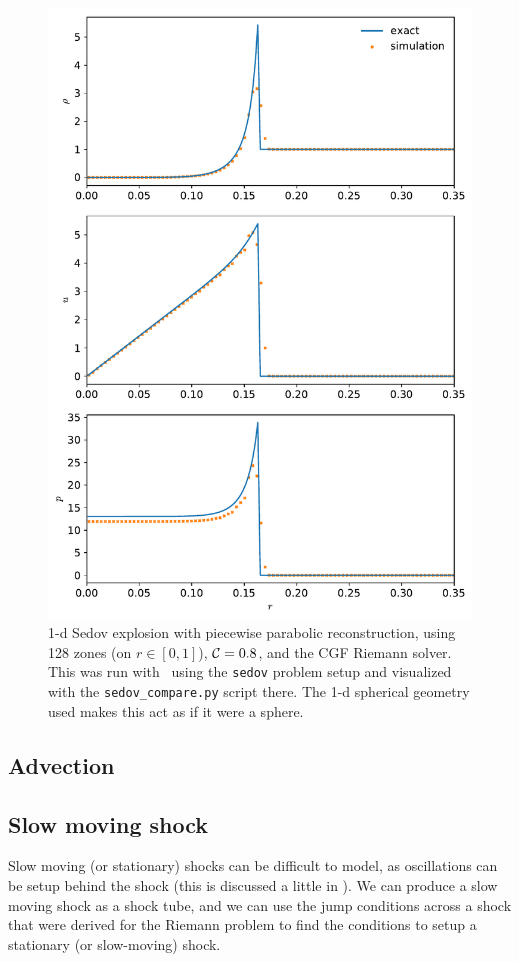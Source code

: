 \begin{figure}[t]
\centering
\includegraphics[width=0.7\linewidth]{hydro1d_sedov_1dsph}
\caption[1-d spherical Sedov problem]{\label{fig:Euler:doublerare:ppm} 1-d Sedov explosion with
  piecewise parabolic reconstruction, using 128 zones (on $r \in
  [0,1]$), ${\mathcal{C}} = 0.8$, and the CGF Riemann solver.  This was run
  with \hydrooned\ using the {\tt sedov} problem setup and visualized
  with the {\tt sedov\_compare.py} script there.  The 1-d spherical
  geometry used makes this act as if it were a sphere.}
\end{figure}


\subsection{Advection}

\subsection{Slow moving shock}

Slow moving (or stationary) shocks can be difficult to model, as
oscillations can be setup behind the shock (this is discussed a little
in \cite{colellawoodward:1984,leveque:2002}).  We can produce a slow
moving shock as a shock tube, and we can use the jump conditions 
across a shock that were derived for the Riemann problem to find the
conditions to setup a stationary (or slow-moving) shock.  

